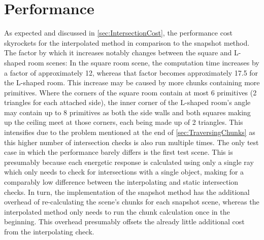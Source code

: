 \section{Performance}

As expected and discussed in \autoref{sec:IntersectionCost},
the performance cost skyrockets for the interpolated method in comparison to the snapshot method.
The factor by which it increases notably changes between the square and L-shaped room scenes:
In the square room scene, the computation time increases by a factor of approximately 12,
whereas that factor becomes approximately 17.5 for the L-shaped room.
\newline
This increase may be caused by more chunks containing more primitives.
Where the corners of the square room contain at most 6 primitives (2 triangles for each attached side),
the inner corner of the L-shaped room's angle may contain up to 8 primitives
as both the side walls and both squares making up the ceiling meet at those corners,
each being made up of 2 triangles.
This intensifies due to the problem mentioned at the end of \autoref{sec:TraversingChunks}
as this higher number of intersection checks is also run multiple times.
\newline
The only test case in which the performance barely differs is the first test scene.
This is presumably because each energetic response is calculated using only a single ray
which only needs to check for intersections with a single object,
making for a comparably low difference between the interpolating and static intersection checks.
\newline
In turn, the implementation of the snapshot method has the additional overhead of re-calculating the scene's chunks for each snapshot scene,
whereas the interpolated method only needs to run the chunk calculation once in the beginning.
This overhead presumably offsets the already little additional cost from the interpolating check.
